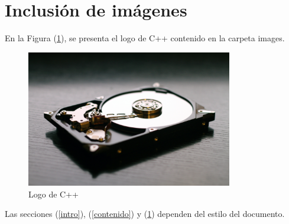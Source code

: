 \documentclass{article}
\begin{document}
	
	\section{Inclusión de imágenes} \label{imagenes}
	
	En la Figura (\ref{fig:cpplogo}), se presenta el logo de C++ contenido en la carpeta images.
	
	\begin{figure}[h]
		\includegraphics[width=9cm]{rom.jpg}
		\caption{Logo de C++}
		\label{fig:cpplogo}
	\end{figure}
	
	Las secciones (\ref{intro}), (\ref{contenido}) y (\ref{imagenes}) dependen del estilo del documento.
	
\end{document}
